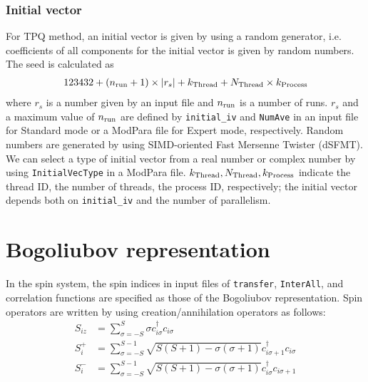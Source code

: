 \subsubsection*{Initial vector}
For TPQ method, an initial vector is given by using a random generator, i.e. coefficients of all components for the initial vector is given by random numbers. The seed is calculated as 
\begin{align}
123432+(n_{\rm run}+1)\times  |r_s|+k_{\rm Thread}+N_{\rm Thread} \times k_{\rm Process}
\end{align}
where $r_s$ is a number given by an input file and $n_{\rm run}$ is a number of runs. $r_s$ and a maximum value of $n_{\rm run}$ are defined by \verb|initial_iv| and \verb|NumAve| in an input file for Standard mode or a ModPara file for Expert mode, respectively. Random numbers are generated by using SIMD-oriented Fast Mersenne Twister (dSFMT)\cite{Mutsuo2008}. We can select a type of initial vector from a real number or complex number by using \verb|InitialVecType| in a ModPara file.
$k_{\rm Thread}, N_{\rm Thread}, k_{\rm Process}$ indicate 
the thread ID, the number of threads, the process ID, respectively;
the initial vector depends both on \verb|initial_iv| and the number of parallelism.

\section{Bogoliubov representation}\label{sec_bogoliubov_rep}

In the spin system,
the spin indices in input files of \verb|transfer|, \verb|InterAll|,
and correlation functions are specified as those of the Bogoliubov representation.
Spin operators are written by using creation/annihilation operators as follows:
\begin{align}
  S_{i z} &= \sum_{\sigma = -S}^{S} \sigma c_{i \sigma}^\dagger c_{i \sigma}
  \\
  S_{i}^+ &= \sum_{\sigma = -S}^{S-1} 
  \sqrt{S(S+1) - \sigma(\sigma+1)} 
  c_{i \sigma+1}^\dagger c_{i \sigma}
  \\
  S_{i}^- &= \sum_{\sigma = -S}^{S-1} 
  \sqrt{S(S+1) - \sigma(\sigma+1)} 
  c_{i \sigma}^\dagger c_{i \sigma+1}
\end{align}

